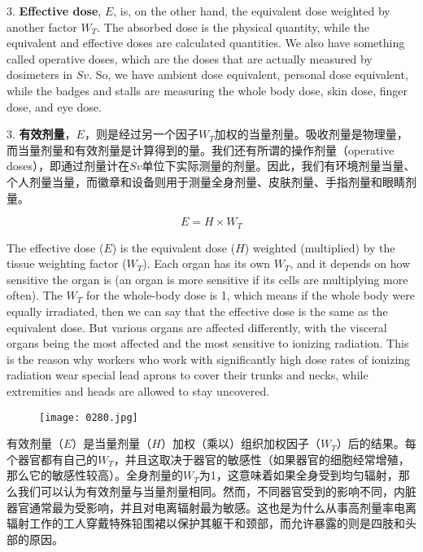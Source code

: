 \documentclass[dvipsnames, svgnames,a4paper,11pt]{article}
\begin{document}
3. \textbf{Effective dose}, \(E\), is, on the other hand, the equivalent dose weighted by another factor \(W_T\). The absorbed dose is the physical quantity, while the equivalent and effective doses are calculated quantities. We also have something called operative doses, which are the doses that are actually measured by dosimeters in \(Sv\). So, we have ambient dose equivalent, personal dose equivalent, while the badges and stalls are measuring the whole body dose, skin dose, finger dose, and eye dose.

3. \textbf{有效剂量}，\(E\)，则是经过另一个因子\(W_T\)加权的当量剂量。吸收剂量是物理量，而当量剂量和有效剂量是计算得到的量。我们还有所谓的操作剂量（operative doses），即通过剂量计在\(Sv\)单位下实际测量的剂量。因此，我们有环境剂量当量、个人剂量当量，而徽章和设备则用于测量全身剂量、皮肤剂量、手指剂量和眼睛剂量。

$$E=H \times W_T$$

The effective dose (\(E\)) is the equivalent dose (\(H\)) weighted (multiplied) by the tissue weighting factor (\(W_T\)). Each organ has its own \(W_T\), and it depends on how sensitive the organ is (an organ is more sensitive if its cells are multiplying more often). The \(W_T\) for the whole-body dose is 1, which means if the whole body were equally irradiated, then we can say that the effective dose is the same as the equivalent dose. But various organs are affected differently, with the visceral organs being the most affected and the most sensitive to ionizing radiation. This is the reason why workers who work with significantly high dose rates of ionizing radiation wear special lead aprons to cover their trunks and necks, while extremities and heads are allowed to stay uncovered.

\begin{figure}[h]
        \centering
        \texttt{[image: 0280.jpg]}  
         \label{fig373}
    \end{figure}


有效剂量（\(E\)）是当量剂量（\(H\)）加权（乘以）组织加权因子（\(W_T\)）后的结果。每个器官都有自己的\(W_T\)，并且这取决于器官的敏感性（如果器官的细胞经常增殖，那么它的敏感性较高）。全身剂量的\(W_T\)为1，这意味着如果全身受到均匀辐射，那么我们可以认为有效剂量与当量剂量相同。然而，不同器官受到的影响不同，内脏器官通常最为受影响，并且对电离辐射最为敏感。这也是为什么从事高剂量率电离辐射工作的工人穿戴特殊铅围裙以保护其躯干和颈部，而允许暴露的则是四肢和头部的原因。
\end{document}
